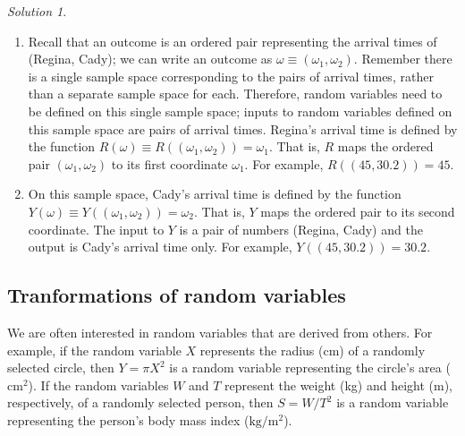 \documentclass[
  letterpaper,
  DIV=11,
  numbers=noendperiod]{scrreprt}
\providecommand{\tightlist}{%
  \setlength{\itemsep}{0pt}\setlength{\parskip}{0pt}}
\theoremstyle{plain}
\theoremstyle{definition}
\theoremstyle{definition}
\theoremstyle{definition}
\theoremstyle{remark}
\newtheorem{refsolution}{Solution}[chapter]
\begin{document}
\begin{tcolorbox}[enhanced jigsaw, opacityback=0, rightrule=.15mm, coltitle=black, colframe=quarto-callout-tip-color-frame, toprule=.15mm, colbacktitle=quarto-callout-tip-color!10!white, opacitybacktitle=0.6, left=2mm, toptitle=1mm, breakable, title={Solution (click to expand)}, bottomtitle=1mm, colback=white, leftrule=.75mm, titlerule=0mm, arc=.35mm, bottomrule=.15mm]

\begin{refsolution}
\leavevmode

\begin{enumerate}
\def\labelenumi{\arabic{enumi}.}
\tightlist
\item
  Recall that an outcome is an ordered pair representing the arrival
  times of (Regina, Cady); we can write an outcome as
  \(\omega\equiv(\omega_1, \omega_2)\). Remember there is a single
  sample space corresponding to the pairs of arrival times, rather than
  a separate sample space for each. Therefore, random variables need to
  be defined on this single sample space; inputs to random variables
  defined on this sample space are pairs of arrival times. Regina's
  arrival time is defined by the function
  \(R(\omega) \equiv R((\omega_1, \omega_2))=\omega_1\). That is, \(R\)
  maps the ordered pair \((\omega_1, \omega_2)\) to its first coordinate
  \(\omega_1\). For example, \(R((45, 30.2)) = 45\).
\item
  On this sample space, Cady's arrival time is defined by the function
  \(Y(\omega) \equiv Y((\omega_1, \omega_2))=\omega_2\). That is, \(Y\)
  maps the ordered pair to its second coordinate. The input to \(Y\) is
  a pair of numbers (Regina, Cady) and the output is Cady's arrival time
  only. For example, \(Y((45, 30.2)) = 30.2\).
\end{enumerate}

\label{sol-exm-meeting-rv-function}

\end{refsolution}

\end{tcolorbox}

\subsection{Tranformations of random
variables}\label{tranformations-of-random-variables}

We are often interested in random variables that are derived from
others. For example, if the random variable \(X\) represents the radius
(cm) of a randomly selected circle, then \(Y = \pi X^2\) is a random
variable representing the circle's area (\(\text{cm}^2\)). If the random
variables \(W\) and \(T\) represent the weight (kg) and height (m),
respectively, of a randomly selected person, then \(S = W / T^2\) is a
random variable representing the person's body mass index
(\(\text{kg}/\text{m}^2\)).
\end{document}
